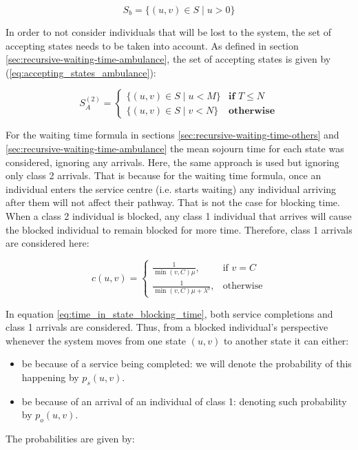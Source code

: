 \begin{equation*}
    S_b = \{(u,v) \in S \; | \; u > 0\}
\end{equation*}
 
In order to not consider individuals that will be lost to the system, the set of 
accepting states needs to be taken into account. As defined in section 
\ref{sec:recursive-waiting-time-ambulance},
the set of accepting states is given by (\ref{eq:accepting_states_ambulance}):

\begin{equation*}
    S_A^{(2)}=
    \begin{cases}
        \{(u, v) \in S \; | \; u < M \} & \textbf{if } T \leq N\\
        \{(u, v) \in S \; | \; v < N \} & \textbf{otherwise}
    \end{cases}
\end{equation*}

For the waiting time formula in sections \ref{sec:recursive-waiting-time-others}
and \ref{sec:recursive-waiting-time-ambulance}
the mean sojourn time for each state was considered,
ignoring any arrivals. Here, the same approach is used but ignoring only class 2
arrivals. That is because for the waiting time formula, once an individual enters 
the service centre (i.e. starts waiting) any individual arriving after them will 
not affect their
pathway. That is not the case for blocking time. When a class 2 individual is 
blocked, 
any class 1 individual that arrives will cause the blocked individual to remain 
blocked for more time. Therefore, class 1 arrivals are considered here:

\begin{equation}\label{eq:time_in_state_blocking_time}
    c(u,v) = 
    \begin{cases}
        \frac{1}{\min(v,C) \mu}, & \text{if } v = C\\
        \frac{1}{\min(v,C) \mu + \lambda^o}, & \text{otherwise}
    \end{cases}
\end{equation}
 
In equation \ref{eq:time_in_state_blocking_time}, both service completions and 
class 1 arrivals are considered. 
Thus, from a blocked individual's perspective whenever the system moves from one 
state \((u,v)\)
to another state it can either:

\begin{itemize}
    \item be because of a service being completed: we will denote the probability 
    of this happening by \(p_s(u,v)\). 
    \item be because of an arrival of an individual of class 1: denoting such 
    probability by \(p_o(u,v)\).
\end{itemize}
The probabilities are given by:

